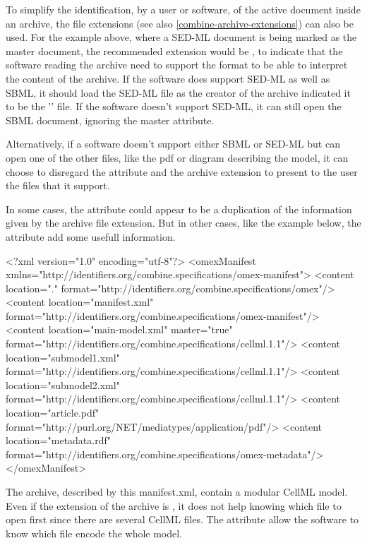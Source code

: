 To simplify the identification, by a user or software, of the active document inside an archive, the file extensions 
(see also \ref{combine-archive-extensions}) can also be used. For the example above, 
where a SED-ML document is being marked as the master document, the 
recommended extension would be , to indicate that the software reading the archive need
to support the  format to be able to interpret the content of the archive. If the software
does support SED-ML as well as SBML, it should load the SED-ML file as the creator of the archive indicated
it to be the '' file. If the software doesn't support SED-ML, it can still open the SBML document, ignoring
the master attribute.

Alternatively, if a software doesn't support either SBML or SED-ML but can open one of the other files, like the pdf
or diagram describing the model, it can choose to disregard the  attribute and the archive extension to present to the user the
files that it support.

In some cases, the  attribute could appear to be a duplication of the information given by the archive file
extension. But in other cases, like the example below, the  attribute add some usefull information.


\begin{example}
<?xml version="1.0" encoding="utf-8"?>
<omexManifest xmlns="http://identifiers.org/combine.specifications/omex-manifest">
    <content location="." format="http://identifiers.org/combine.specifications/omex"/>
    <content location="manifest.xml" 
        format="http://identifiers.org/combine.specifications/omex-manifest"/>
    <content location="main-model.xml" master="true"
        format="http://identifiers.org/combine.specifications/cellml.1.1"/>
    <content location="submodel1.xml" 
        format="http://identifiers.org/combine.specifications/cellml.1.1"/>
    <content location="submodel2.xml" 
        format="http://identifiers.org/combine.specifications/cellml.1.1"/>
    <content location="article.pdf" format="http://purl.org/NET/mediatypes/application/pdf"/>
    <content location="metadata.rdf"
        format="http://identifiers.org/combine.specifications/omex-metadata"/>
</omexManifest>
\end{example}

The archive, described by this manifest.xml, contain a modular CellML model. Even if the extension of the archive is , it
does not help knowing which file to open first since there are several CellML files. The  attribute allow the software
to know which file encode the whole model.

